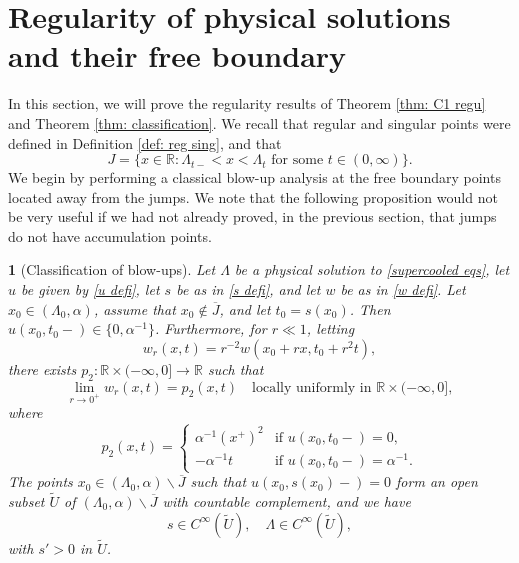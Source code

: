 \documentclass{article}
\numberwithin{equation}{section}
\numberwithin{figure}{section}
\theoremstyle{plain}
\theoremstyle{plain}
\newtheorem{prop}[thm]{\protect\propositionname}
\theoremstyle{plain}
\theoremstyle{plain}
\theoremstyle{definition}
\theoremstyle{remark}
\def\R{{\mathbb{R}}}
\providecommand{\propositionname}{Proposition}
\begin{document}
\section{Regularity of physical solutions and their free boundary} \label{sec:regularity}
In this section, we will prove the regularity results of Theorem \ref{thm: C1 regu} and Theorem \ref{thm: classification}. We recall that regular and singular points were defined in Definition \ref{def: reg sing}, and that
\begin{equation}
    J=\{x\in \R: \Lambda_{t-}<x<\Lambda_{t} \text{ for some } t\in (0,\infty)\}.
\end{equation}
We begin by performing a classical blow-up analysis at the free boundary points located away from the jumps. We note that the following proposition would not be very useful if we had not already proved, in the previous section, that jumps do not have accumulation points.
\begin{prop}[Classification of blow-ups] \label{prop: blow-ups} Let $\Lambda$ be a physical solution to \eqref{supercooled eqs}, let $u$ be given by \eqref{u defi}, let $s$ be as in \eqref{s defi}, and let $w$ be as in \eqref{w defi}. Let $x_0\in (\Lambda_0,\alpha)$, assume that $x_0\notin \overline{J}$, and let $t_0=s(x_0)$. Then $u(x_0,t_0-)\in \{0,\alpha^{-1}\}$. Furthermore,  for $r\ll1$, letting
\[ w_r(x,t)=r^{-2}w(x_0+rx,t_0+r^2t),\]
there exists $p_2:\R \times (-\infty,0] \to \R$ such that
\begin{equation} \label{eq: blow up lim}\lim_{r\to 0^+}w_r(x,t)=p_2(x,t) \quad \text{locally uniformly in } \R \times (-\infty,0],\end{equation}
where
\begin{equation} \label{blow up types}
    p_2(x,t)=\begin{cases} \alpha^{-1}(x^{+})^2 & \text{if } u(x_0,t_0-)=0, \\
    -\alpha^{-1}t & \text{if } u(x_0,t_0-)=\alpha^{-1}.        
    \end{cases}
\end{equation}
The points $x_0 \in (\Lambda_0,\alpha)\backslash \overline{J}$ such that $u(x_0,s(x_0)-)=0$ form an open subset $\tilde{U}$ of $(\Lambda_0,\alpha)\backslash \overline{J}$ with countable complement, and we have
\[ s\in C^{\infty}(\tilde{U}),\quad \Lambda\in C^{\infty}(\tilde{U}),\]
with $s'>0$ in $\tilde{U}$.
\end{prop}
\end{document}
